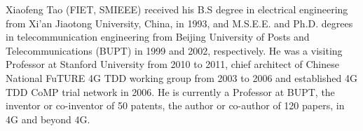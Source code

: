 \documentclass[english]{IEEEtran}
\theoremstyle{plain}
\theoremstyle{plain}
\theoremstyle{plain}
\theoremstyle{remark}
\begin{document}
\begin{IEEEbiography}
{Xiaofeng Tao}
 (FIET, SMIEEE) received his B.S degree in electrical engineering from Xi'an Jiaotong University, China, in 1993, and M.S.E.E. and Ph.D. degrees in telecommunication engineering from Beijing University of Posts and Telecommunications (BUPT) in 1999 and 2002, respectively. He was a visiting Professor at Stanford University from 2010 to 2011, chief architect of Chinese National FuTURE 4G TDD working group from 2003 to 2006 and established 4G TDD CoMP trial network in 2006. He is currently a Professor at BUPT, the inventor or co-inventor of 50 patents, the author or co-author of 120 papers, in 4G and beyond 4G.
\end{IEEEbiography}
\end{document}
